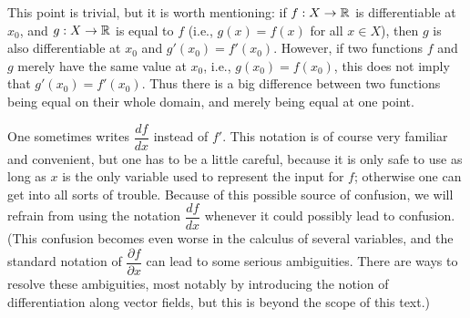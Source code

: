 \setcounter{thm}{3}
\begin{rmk}\label{10.1.4}
  This point is trivial, but it is worth mentioning:
  if \(f : X \to \mathbb{R}\) is differentiable at \(x_0\), and \(g : X \to \mathbb{R}\) is equal to \(f\) (i.e., \(g(x) = f(x)\) for all \(x \in X\)), then \(g\) is also differentiable at \(x_0\) and \(g'(x_0) = f'(x_0)\).
  However, if two functions \(f\) and \(g\) merely have the same value at \(x_0\), i.e., \(g(x_0) = f(x_0)\), this does not imply that \(g'(x_0) = f'(x_0)\).
  Thus there is a big difference between two functions being equal on their whole domain, and merely being equal at one point.
\end{rmk}

\begin{rmk}\label{10.1.5}
  One sometimes writes \(\dfrac{df}{dx}\) instead of \(f'\).
  This notation is of course very familiar and convenient, but one has to be a little careful, because it is only safe to use as long as \(x\) is the only variable used to represent the input for \(f\);
  otherwise one can get into all sorts of trouble.
  Because of this possible source of confusion, we will refrain from using the notation \(\dfrac{df}{dx}\) whenever it could possibly lead to confusion.
  (This confusion becomes even worse in the calculus of several variables, and the standard notation of \(\dfrac{\partial f}{\partial x}\) can lead to some serious ambiguities.
  There are ways to resolve these ambiguities, most notably by introducing the notion of differentiation along vector fields, but this is beyond the scope of this text.)
\end{rmk}

